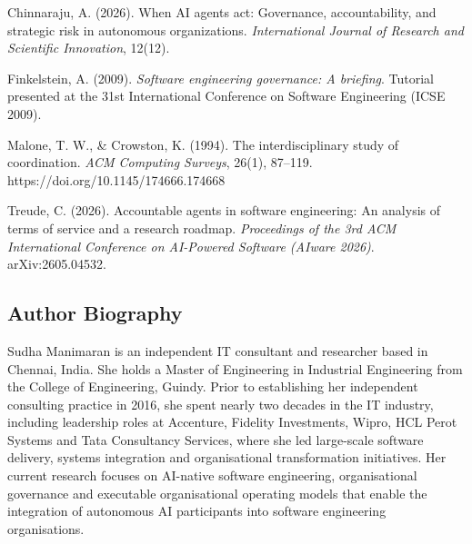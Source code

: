 \documentclass[
]{article}
\begin{document}
Chinnaraju, A. (2026). When AI agents act: Governance, accountability,
and strategic risk in autonomous organizations. \emph{International
Journal of Research and Scientific Innovation}, 12(12).

Finkelstein, A. (2009). \emph{Software engineering governance: A
briefing}. Tutorial presented at the 31st International Conference on
Software Engineering (ICSE 2009).

Malone, T. W., \& Crowston, K. (1994). The interdisciplinary study of
coordination. \emph{ACM Computing Surveys}, 26(1), 87--119.
https://doi.org/10.1145/174666.174668

Treude, C. (2026). Accountable agents in software engineering: An
analysis of terms of service and a research roadmap. \emph{Proceedings
of the 3rd ACM International Conference on AI-Powered Software (AIware
2026)}. arXiv:2605.04532.

\hypertarget{author-biography}{%
\subsection{Author Biography}\label{author-biography}}

Sudha Manimaran is an independent IT consultant and researcher based in
Chennai, India. She holds a Master of Engineering in Industrial
Engineering from the College of Engineering, Guindy. Prior to
establishing her independent consulting practice in 2016, she spent
nearly two decades in the IT industry, including leadership roles at
Accenture, Fidelity Investments, Wipro, HCL Perot Systems and Tata
Consultancy Services, where she led large-scale software delivery,
systems integration and organisational transformation initiatives. Her
current research focuses on AI-native software engineering,
organisational governance and executable organisational operating models
that enable the integration of autonomous AI participants into software
engineering organisations.
\end{document}
